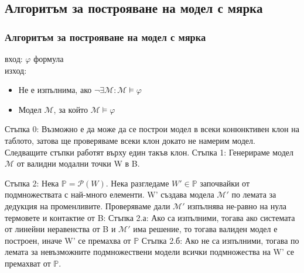 \documentclass{beamer}
\begin{document}
\subsection{Алгоритъм за построяване на модел с мярка}
\begin{frame}\frametitle{Алгоритъм за построяване на модел с мярка}
	вход: $\varphi$ формула  \\
	изход: 
\begin{itemize}
	\item Не е изпълнима, ако $\neg \exists \mathcal{M}: \mathcal{M} \models \varphi$
	\item Модел $\mathcal{M}$, за който $\mathcal{M} \models \varphi$
\end{itemize}
\end{frame}

\begin{frame}
Стъпка 0:
\newline
Възможно е да може да се построи модел в всеки конюнктивен клон на таблото, затова ще проверяваме всеки клон докато не намерим модел.
\newline
Следващите стъпки работят върху един такъв клон.
\newline
\newline
Стъпка 1:
\newline
Генерираме модел $\mathcal{M}$ от валидни модални точки W в B.
\end{frame}

\begin{frame}
Стъпка 2:
\newline
Нека $\mathbb{P} = \mathcal{P}(W)$. Нека разгледаме $W' \in \mathbb{P}$ започвайки от подмножествата с най-много елементи.
			W' създава модела $\mathcal{M'}$ по лемата за дедукция на променливите.
			Проверяваме дали $\mathcal{M'}$ изпълнява не-равно на нула термовете и контактие от B:
\newline
\newline
Стъпка 2.а:
\newline
 Ако са изпълними, тогава ако системата от линейни неравенства от B и $\mathcal{M'}$ има решение, то тогава валиден модел е построен, иначе W' се премахва от $\mathbb{P}$
\newline
\newline
Стъпка 2.б:
\newline
Ако не са изпълними, тогава по лемата за невъзможните подмножествени модели всички подмножества на W' се премахват от $\mathbb{P}$.
\end{frame}
\end{document}
